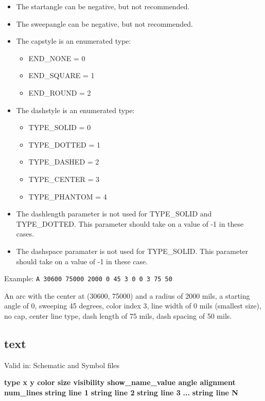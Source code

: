 \documentclass{article}
\begin{document}
\begin{itemize}
\item The startangle can be negative, but not recommended.
\item The sweepangle can be negative, but not recommended.
\item The capstyle is an enumerated type: 
\begin{itemize}
	\item END\_NONE = 0
	\item END\_SQUARE = 1
	\item END\_ROUND = 2
\end{itemize}
\item The dashstyle is an enumerated type: 
\begin{itemize}
	\item TYPE\_SOLID = 0 
	\item TYPE\_DOTTED = 1
	\item TYPE\_DASHED = 2
	\item TYPE\_CENTER = 3
        \item TYPE\_PHANTOM = 4
\end{itemize}
\item The dashlength parameter is not used for TYPE\_SOLID and TYPE\_DOTTED.  
      This parameter should take on a value of -1 in these cases.
\item The dashspace paramater is not used for TYPE\_SOLID.
      This parameter should take on a value of -1 in these case.
\end{itemize}

Example:\newline
{\tt A 30600 75000 2000 0 45 3 0 0 3 75 50}

An arc with the center at (30600, 75000) and a radius of 2000 mils, a 
starting angle of 0, sweeping 45 degrees, color index 3, line width of 0 mils 
(smallest size), no cap, center line type, dash length of 75 mils, dash 
spacing of 50 mils.


\subsection{text}

Valid in: Schematic and Symbol files

{\bf type x y color size visibility show\_name\_value angle alignment num\_lines}\newline
{\bf string line 1}\newline
{\bf string line 2}\newline
{\bf string line 3}\newline
{\bf ...}\newline
{\bf string line N}\newline
\end{document}
